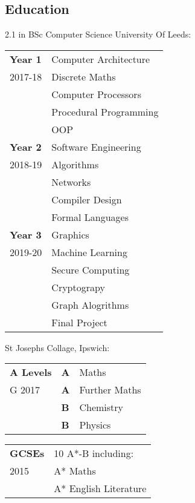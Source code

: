 \documentclass[9pt,a4paper]{article}
\begin{document}
\begin{multicols*}{3}
  \section*{Education}
  \vspace*{-.3cm}
  2.1 in BSc Computer Science 
  \newline University Of Leeds:
  \vspace*{-6mm}
\begin{center}
  \begin{tabular}{p{1.2cm}p{5.4cm}}
    \textbf{Year 1}&Computer Architecture\\
	2017-18&Discrete Maths\\
			&Computer Processors\\
	    &Procedural Programming\\
      &OOP\vspace{.3cm}\\
    \textbf{Year 2}&Software Engineering\\
    2018-19&Algorithms\\
    &Networks\\
    &Compiler Design\\
    &Formal Languages\vspace{.3cm}\\
    \textbf{Year 3}&Graphics\\
    2019-20&Machine Learning\\
    &Secure Computing\\
    &Cryptograpy\\
    &Graph Alogrithms\\
    &Final Project
  \end{tabular}
\end{center}
  St Josephs Collage, Ipswich:
  \vspace*{-.6cm}
\begin{center}
  \begin{tabular}{p{1.5cm} p{0.3cm} p{5.4cm}}
    \textbf{A Levels}&\textbf{A}&Maths\\
G	2017&\textbf{A}&Further Maths\\
	    &\textbf{B}&Chemistry\\
	    &\textbf{B}&Physics\\
  \end{tabular}
  \begin{tabular}{p{1.5cm} p{5.7cm}}
    \textbf{GCSEs}
        & 10 A*-B including:\\
        2015&A* Maths\\
        &A* English Literature
  \end{tabular}
\end{center}


\end{multicols*}
\end{document}

